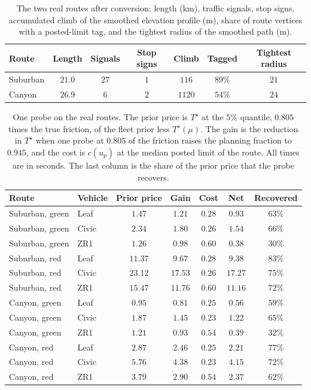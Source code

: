 \begin{table}[htbp]
\centering\small
\caption{The two real routes after conversion: length (km), traffic signals, stop signs, accumulated climb of the smoothed elevation profile (m), share of route vertices with a posted-limit tag, and the tightest radius of the smoothed path (m).}\label{tab:app-routes}
\begin{tabular}{lcccccc}
\toprule
Route & Length & Signals & Stop signs & Climb & Tagged & Tightest radius\\
\midrule
Suburban & $21.0$ & $27$ & $1$ & $116$ & $89\%$ & $21$\\
Canyon & $26.9$ & $6$ & $2$ & $1120$ & $54\%$ & $24$\\
\bottomrule
\end{tabular}
\end{table}

\begin{table}[htbp]
\centering\small
\caption{One probe on the real routes. The prior price is $T^\star$ at the $5\%$ quantile, $0.805$ times the true friction, of the fleet prior less $T^\star(\mu)$. The gain is the reduction in $T^\star$ when one probe at $0.805$ of the friction raises the planning fraction to $0.945$, and the cost is $c(u_p)$ at the median posted limit of the route. All times are in seconds. The last column is the share of the prior price that the probe recovers.}\label{tab:app-routeprobe}
\begin{tabular}{llccccc}
\toprule
Route & Vehicle & Prior price & Gain & Cost & Net & Recovered\\
\midrule
Suburban, green & Leaf & $1.47$ & $1.21$ & $0.28$ & $0.93$ & $63\%$\\
Suburban, green & Civic & $2.34$ & $1.80$ & $0.26$ & $1.54$ & $66\%$\\
Suburban, green & ZR1 & $1.26$ & $0.98$ & $0.60$ & $0.38$ & $30\%$\\
Suburban, red & Leaf & $11.37$ & $9.67$ & $0.28$ & $9.38$ & $83\%$\\
Suburban, red & Civic & $23.12$ & $17.53$ & $0.26$ & $17.27$ & $75\%$\\
Suburban, red & ZR1 & $15.47$ & $11.76$ & $0.60$ & $11.16$ & $72\%$\\
Canyon, green & Leaf & $0.95$ & $0.81$ & $0.25$ & $0.56$ & $59\%$\\
Canyon, green & Civic & $1.87$ & $1.45$ & $0.23$ & $1.22$ & $65\%$\\
Canyon, green & ZR1 & $1.21$ & $0.93$ & $0.54$ & $0.39$ & $32\%$\\
Canyon, red & Leaf & $2.87$ & $2.46$ & $0.25$ & $2.21$ & $77\%$\\
Canyon, red & Civic & $5.76$ & $4.38$ & $0.23$ & $4.15$ & $72\%$\\
Canyon, red & ZR1 & $3.79$ & $2.90$ & $0.54$ & $2.37$ & $62\%$\\
\bottomrule
\end{tabular}
\end{table}

